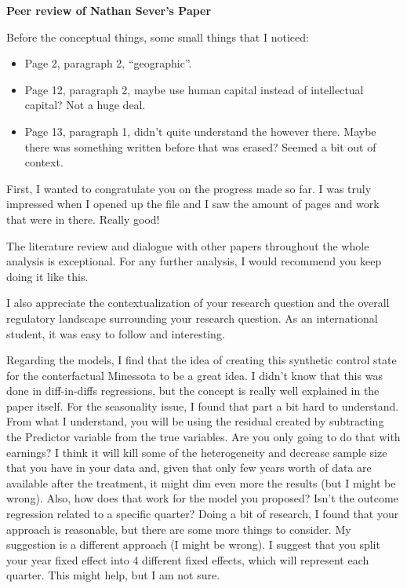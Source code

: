 \documentclass[12pt, a4paper]{article}
\begin{document}
\textbf{{\Large Peer review of Nathan Sever's Paper}}

\vspace{1cm}

Before the conceptual things, some small things that I noticed:

\begin{itemize}
	\item Page 2, paragraph 2, ``geographic''.
	\item Page 12, paragraph 2, maybe use human capital instead of intellectual capital? Not a huge deal.
	\item Page 13, paragraph 1, didn't quite understand the however there. Maybe there was something written before that was erased? Seemed a bit out of context.
\end{itemize}

First, I wanted to congratulate you on the progress made so far. I was truly impressed when I opened up the file and I saw the amount of pages and work that were in there. Really good!

The literature review and dialogue with other papers throughout the whole analysis is exceptional. For any further analysis, I would recommend you keep doing it like this.

I also appreciate the contextualization of your research question and the overall regulatory landscape surrounding your research question. As an international student, it was easy to follow and interesting.

Regarding the models, I find that the idea of creating this synthetic control state for the conterfactual Minessota to be a great idea. I didn't know that this was done in diff-in-diffs regressions, but the concept is really well explained in the paper itself. For the seasonality issue, I found that part a bit hard to understand. From what I understand, you will be using the residual created by subtracting the Predictor variable from the true variables. Are you only going to do that with earnings? I think it will kill some of the heterogeneity and decrease sample size that you have in your data and, given that only few years worth of data are available after the treatment, it might dim even more the results (but I might be wrong). Also, how does that work for the model you proposed? Isn't the outcome regression related to a specific quarter? Doing a bit of research, I found that your approach is reasonable, but there are some more things to consider. My suggestion is a different approach (I might be wrong). I suggest that you split your year fixed effect into 4 different fixed effects, which will represent each quarter. This might help, but I am not sure.
\end{document}

